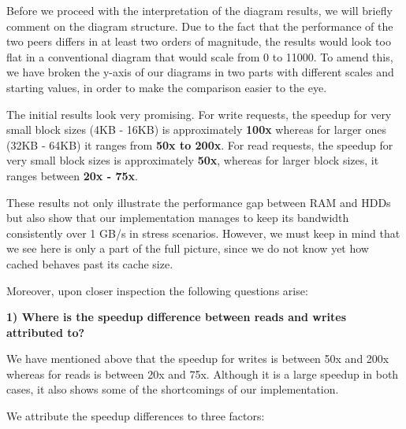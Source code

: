 Before we proceed with the interpretation of the diagram results, we will 
briefly comment on the diagram structure. Due to the fact that the performance 
of the two peers differs in at least two orders of magnitude, the results would 
look too flat in a conventional diagram that would scale from 0 to 11000. To 
amend this, we have broken the y-axis of our diagrams in two parts with 
different scales and starting values, in order to make the comparison easier to 
the eye.


The initial results look very promising. For write requests, the speedup for 
very small block sizes (4KB - 16KB) is approximately \textbf{100x} whereas for 
larger ones (32KB - 64KB) it ranges from \textbf{50x to 200x}. For read 
requests, the speedup for very small block sizes is approximately \textbf{50x}, 
whereas for larger block sizes, it ranges between \textbf{20x - 75x}.

These results not only illustrate the performance gap between RAM and
HDDs but also show that our implementation manages to keep its bandwidth 
consistently over 1 GB/s in stress scenarios. However, we must keep in mind 
that we see here is only a part of the full picture, since we do not know yet 
how cached behaves past its cache size.

Moreover, upon closer inspection the following questions arise:

\textbf{1) Where is the speedup difference between reads and writes attributed 
	to?}

We have mentioned above that the speedup for writes is between 50x and 200x 
whereas for reads is between 20x and 75x. Although it is a large speedup in 
both cases, it also shows some of the shortcomings of our implementation.

We attribute the speedup differences to three factors:

